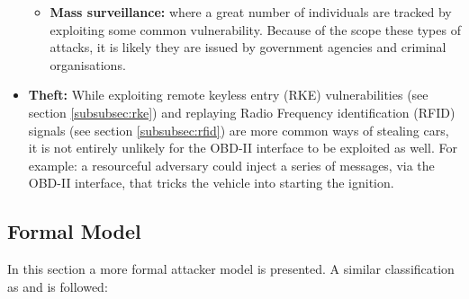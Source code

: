 \begin{itemize}
\begin{itemize}
		\item \textbf{Mass surveillance:} where a great number of individuals are tracked by exploiting some common vulnerability. Because of the scope these types of attacks, it is likely they are issued by government agencies and criminal organisations.
	\end{itemize}
	
	
	\item \textbf{Theft:} While exploiting remote keyless entry (RKE) vulnerabilities (see section \ref{subsubsec:rke}) and replaying Radio Frequency identification (RFID) signals (see section \ref{subsubsec:rfid}) are more common ways of stealing cars, it is not entirely unlikely for the OBD-II interface to be exploited as well. For example: a resourceful adversary could inject a series of messages, via the OBD-II interface, that tricks the vehicle into starting the ignition.	
\end{itemize}

\subsection{Formal Model}
In this section a more formal attacker model is presented. A similar classification as \cite{Maxim} and \cite{Petit} is followed:

